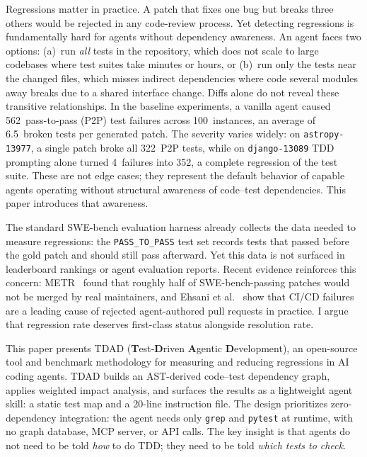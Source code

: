 \documentclass[sigconf,nonacm]{acmart}
\begin{document}
Regressions matter in practice.  A patch that fixes one bug but breaks
three others would be rejected in any code-review process.  Yet
detecting regressions is fundamentally hard for agents without
dependency awareness.  An agent faces two options: (a)~run \emph{all}
tests in the repository, which does not scale to large codebases where
test suites take minutes or hours, or (b)~run only the tests near the
changed files, which misses indirect dependencies where code several
modules away breaks due to a shared interface change.  Diffs alone do
not reveal these transitive relationships.  In the baseline experiments, a vanilla agent caused
562~pass-to-pass (P2P) test failures across 100~instances, an average
of 6.5~broken tests per generated patch.  The severity varies widely:
on \texttt{astropy-13977}, a single patch broke all 322~P2P tests,
while on \texttt{django-13089} TDD prompting alone turned 4~failures
into 352, a complete regression of the test suite.  These are not
edge cases; they represent the default behavior of capable agents
operating without structural awareness of code--test dependencies.
This paper introduces that awareness.

The standard SWE-bench evaluation harness already collects the data needed to
measure regressions: the \texttt{PASS\_TO\_PASS} test set records tests that
passed before the gold patch and should still pass afterward.  Yet this data
is not surfaced in leaderboard rankings or agent evaluation reports.  Recent
evidence reinforces this concern: METR~\cite{metr2026swebench} found that
roughly half of SWE-bench-passing patches would not be merged by real
maintainers, and Ehsani et al.~\cite{ehsani2026agentfail} show that CI/CD
failures are a leading cause of rejected agent-authored pull requests in
practice.  I argue that regression rate deserves first-class status alongside
resolution rate.

This paper presents \textsc{TDAD} (\textbf{T}est-\textbf{D}riven \textbf{A}gentic
\textbf{D}evelopment), an open-source tool and benchmark methodology for
measuring and reducing regressions in AI coding agents.  \textsc{TDAD} builds
an AST-derived code--test dependency graph, applies weighted impact analysis,
and surfaces the results as a lightweight agent skill: a static test map and
a 20-line instruction file.  The design prioritizes zero-dependency
integration: the agent needs only \texttt{grep} and \texttt{pytest} at
runtime, with no graph database, MCP server, or API calls.  The key insight
is that agents do not need to be told \emph{how} to do TDD; they need to be
told \emph{which tests to check}.
\end{document}
